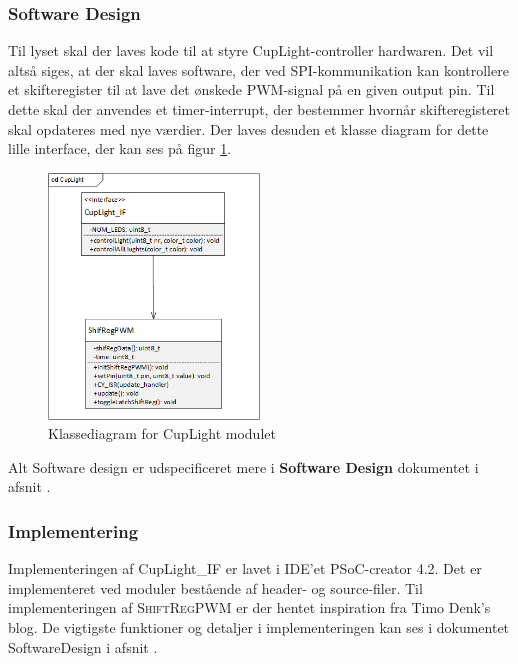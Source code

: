 \documentclass[Rapport/Rapport_main.tex]{subfiles}
\begin{document}
\subsubsection{Software Design}
Til lyset skal der laves kode til at styre CupLight-controller hardwaren. Det vil altså siges, at der skal laves software, der ved SPI-kommunikation kan kontrollere et skifteregister til at lave det ønskede PWM-signal på en given output pin. Til dette skal der anvendes et timer-interrupt, der bestemmer hvornår skifteregisteret skal opdateres med nye værdier. Der laves desuden et klasse diagram for dette lille interface, der kan ses på figur \ref{fig:rap_cd_cuplight}.
\begin{figure}[H]
    \centering
    \includegraphics[width=0.5\textwidth]{Softwaredesign/CupLight_IF/graphics/CD_CupLight.png}
    \caption{Klassediagram for CupLight modulet}
    \label{fig:rap_cd_cuplight}
\end{figure}
Alt Software design er udspecificeret mere i \textbf{Software Design} dokumentet i afsnit .
\subsubsection{Implementering}
Implementeringen af CupLight\_IF er lavet i IDE'et PSoC-creator 4.2. Det er implementeret ved moduler bestående af header- og source-filer. Til implementeringen af \textsc{ShiftRegPWM} er der hentet inspiration fra Timo Denk's blog\cite{shiftregpwm}. De vigtigste funktioner og detaljer i implementeringen kan ses i dokumentet SoftwareDesign i afsnit .
\end{document}
